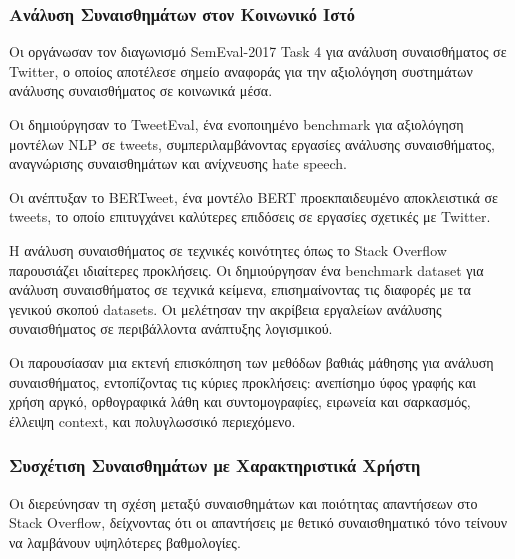 \documentclass[a4paper,11pt,oneside,openany]{ioniothesis}
\begin{document}
\subsubsection{Ανάλυση Συναισθημάτων στον Κοινωνικό Ιστό}
\label{sec:Ανάλυση Συναισθημάτων στον Κοινωνικό Ιστό}

Οι \cite{rosenthal2017semeval} οργάνωσαν τον διαγωνισμό SemEval-2017 Task 4 για ανάλυση συναισθήματος σε Twitter, ο οποίος αποτέλεσε σημείο αναφοράς για την αξιολόγηση συστημάτων ανάλυσης συναισθήματος σε κοινωνικά μέσα.

Οι \cite{barbieri2020tweeteval} δημιούργησαν το TweetEval, ένα ενοποιημένο benchmark για αξιολόγηση μοντέλων NLP σε tweets, συμπεριλαμβάνοντας εργασίες ανάλυσης συναισθήματος, αναγνώρισης συναισθημάτων και ανίχνευσης hate speech.

Οι \cite{nguyen2020bertweet} ανέπτυξαν το BERTweet, ένα μοντέλο BERT προεκπαιδευμένο αποκλειστικά σε tweets, το οποίο επιτυγχάνει καλύτερες επιδόσεις σε εργασίες σχετικές με Twitter.

Η ανάλυση συναισθήματος σε τεχνικές κοινότητες όπως το Stack Overflow παρουσιάζει ιδιαίτερες προκλήσεις. Οι \cite{novielli2018benchmark} δημιούργησαν ένα benchmark dataset για ανάλυση συναισθήματος σε τεχνικά κείμενα, επισημαίνοντας τις διαφορές με τα γενικού σκοπού datasets. Οι \cite{calefato2018sentiment} μελέτησαν την ακρίβεια εργαλείων ανάλυσης συναισθήματος σε περιβάλλοντα ανάπτυξης λογισμικού.

Οι \cite{zhang2018deep} παρουσίασαν μια εκτενή επισκόπηση των μεθόδων βαθιάς μάθησης για ανάλυση συναισθήματος, εντοπίζοντας τις κύριες προκλήσεις: ανεπίσημο ύφος γραφής και χρήση αργκό, ορθογραφικά λάθη και συντομογραφίες, ειρωνεία και σαρκασμός, έλλειψη context, και πολυγλωσσικό περιεχόμενο.









\subsubsection{Συσχέτιση Συναισθημάτων με Χαρακτηριστικά Χρήστη}
\label{sec:Συσχέτιση Συναισθημάτων με Χαρακτηριστικά Χρήστη}

Οι \cite{lin2022opinion} διερεύνησαν τη σχέση μεταξύ συναισθημάτων και ποιότητας απαντήσεων στο Stack Overflow, δείχνοντας ότι οι απαντήσεις με θετικό συναισθηματικό τόνο τείνουν να λαμβάνουν υψηλότερες βαθμολογίες.
\end{document}
